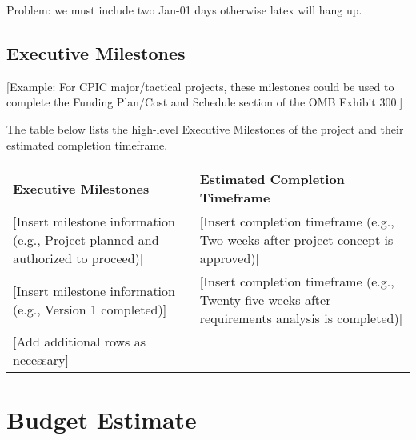 \documentclass[a4paper, 11pt]{article}
\begin{document}
Problem: we must include two Jan-01 days otherwise latex will hang up.


\hypertarget{executive-milestones}{%
\subsection{Executive Milestones }\label{executive-milestones}}

{[}Example: For CPIC major/tactical projects, these milestones could be
used to complete the Funding Plan/Cost and Schedule section of the OMB
Exhibit 300.{]}

The table below lists the high-level Executive Milestones of the project
and their estimated completion timeframe.

\begin{longtable}[]{@{}ll@{}}
\toprule
\textbf{Executive Milestones} & \textbf{Estimated Completion Timeframe}\tabularnewline
\midrule
\endhead
{[}Insert milestone information (e.g., Project planned and authorized to
proceed){]} & {[}Insert completion timeframe (e.g., Two weeks after
project concept is approved){]}\tabularnewline
{[}Insert milestone information (e.g., Version 1 completed){]} &
{[}Insert completion timeframe (e.g., Twenty-five weeks after
requirements analysis is completed){]}\tabularnewline
{[}Add additional rows as necessary{]} &\tabularnewline
\bottomrule
\end{longtable}

\hypertarget{budget-estimate}{%
\section{Budget Estimate}\label{budget-estimate}}
\end{document}
